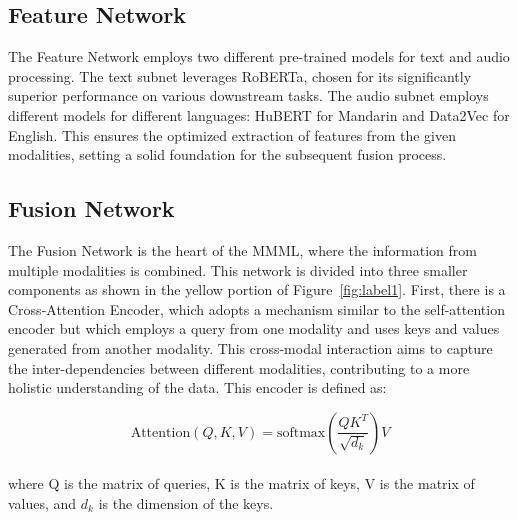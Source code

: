 \documentclass[11pt]{article}
\begin{document}
\subsection{Feature Network}
The Feature Network employs two different pre-trained models for text and audio processing. The text subnet leverages RoBERTa, chosen for its significantly superior performance on various downstream tasks. The audio subnet employs different models for different languages: HuBERT for Mandarin and Data2Vec for English. This ensures the optimized extraction of features from the given modalities, setting a solid foundation for the subsequent fusion process.

\subsection{Fusion Network}
The Fusion Network is the heart of the MMML, where the information from multiple modalities is combined. This network is divided into three smaller components as shown in the yellow portion of Figure~\ref{fig:label1}. First, there is a Cross-Attention Encoder, which adopts a mechanism similar to the self-attention encoder but which employs a query from one modality and uses keys and values generated from another modality. This cross-modal interaction aims to capture the inter-dependencies between different modalities, contributing to a more holistic understanding of the data. This encoder is defined as:

\newenvironment{shrinkeq}[2]%
{ \bgroup
  \addtolength\abovedisplayshortskip{#1}
  \addtolength\abovedisplayskip{#1}
  \addtolength\belowdisplayshortskip{#2}
  \addtolength\belowdisplayskip{#2}}
{\egroup\ignorespacesafterend}
\begin{shrinkeq}{-1ex}{-3ex}
{\small
\begin{equation*}
\text{Attention}(Q, K, V) = \text{softmax}\left(\frac{Q K^T}{\sqrt{d_k}}\right)V
\end{equation*}
}
\end{shrinkeq}\\
where Q is the matrix of queries, K is the matrix of keys, V is the matrix of values, and $d_k$ is the dimension of the keys.\noindent\ignorespacesafterend
\end{document}
